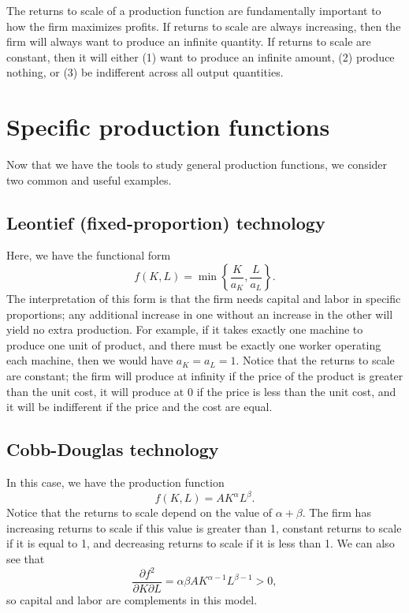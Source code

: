 The returns to scale of a production function are fundamentally important to how the firm maximizes profits. If returns to scale are always increasing, then the firm will always want to produce an infinite quantity. If returns to scale are constant, then it will either (1) want to produce an infinite amount, (2) produce nothing, or (3) be indifferent across all output quantities.

\section{Specific production functions}
Now that we have the tools to study general production functions, we consider two common and useful examples.


\subsection*{Leontief (fixed-proportion) technology}

Here, we have the functional form
$$f(K, L)=\min \left\{\frac{K}{a_{K}}, \frac{L}{a_{L}}\right\}.$$
The interpretation of this form is that the firm needs capital and labor in specific proportions; any additional increase in one without an increase in the other will yield no extra production. For example, if it takes exactly one machine to produce one unit of product, and there must be exactly one worker operating each machine, then we would have $a_K = a_L = 1$. Notice that the returns to scale are constant; the firm will produce at infinity if the price of the product is greater than the unit cost, it will produce at 0 if the price is less than the unit cost, and it will be indifferent if the price and the cost are equal.

\subsection*{Cobb-Douglas technology}

In this case, we have the production function
$$f(K, L) = AK^\alpha L^\beta.$$
Notice that the returns to scale depend on the value of $\alpha + \beta$. The firm has increasing returns to scale if this value is greater than 1, constant returns to scale if it is equal to 1, and decreasing returns to scale if it is less than 1. We can also see that
$$\frac{\partial f^2}{\partial K \partial L} = \alpha \beta AK^{\alpha - 1} L^{\beta -1} > 0,$$
so capital and labor are complements in this model. 

